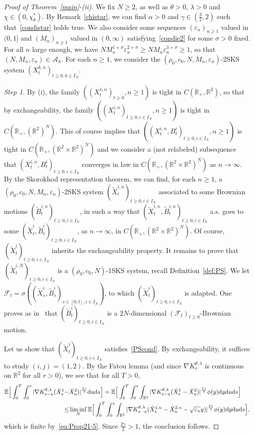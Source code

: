 \documentclass[11pt]{article}
\newcommand{\E}{\mathbb{E}}
\newcommand{\R}{\mathbb{R}}
\newcommand{\1}{\mathbbm{1}}
\newcommand{\tX}{\tilde X}
\newcommand{\tB}{\tilde B}
\newcommand{\dd}{{\rm d}}
\newcommand{\Aa}{\mathcal A}
\newcommand{\Ff}{\mathcal F}
\newcommand{\e}{\varepsilon}
\newcommand{\vip}{\vskip5pt}
\begin{document}
\begin{proof}[Proof of Theorem~\ref{main}-(ii)]
We fix $N\geq 2$, as well as $\theta>0$, $\lambda>0$ and $\chi \in (0,\chi^*_\theta)$. 
By Remark~\ref{chistar}, we can find $\alpha>0$ and $\gamma\in (\frac32,2)$ such that~\eqref{condistar} 
holds true. We also consider some sequences $(\e_n)_{n\geq 1}$ valued in $(0,1]$ and
$(M_n)_{n\geq 1}$ valued in $(0,\infty)$ satisfying~\eqref{condie2}
for some $\sigma>0$ fixed.
For all $n$ large enough, we have $N M_n^{1+\sigma}\e_n^{2+\sigma}\geq N M_n\e_n^{3+\sigma}\geq 1$,
so that $(N,M_n,\e_n)\in \Aa_\sigma$. For each $n\geq 1$, we consider 
the $(\rho_0,c_0,N,M_n,\e_n)$-2SKS system $(X^{k,n}_t)_{t\geq 0, k\in I_N}$.

\vip

{\it Step 1.} By (i), the family
$((X^{1,n}_t)_{t\geq 0}, n \geq 1)$ is tight in $C(\R_+,\R^2)$, so that by exchangeability, the family
$((X^{i,n}_t)_{t\geq 0, i\in I_N}, n \geq 1)$ is tight in $C(\R_+,(\R^2)^N)$. This of course implies that
$((X^{i,n}_t,B^i_t)_{t\geq 0, i\in I_N}, n \geq 1)$ is tight in $C(\R_+,(\R^2\times \R^2)^N)$ and we consider
a (not relabeled) subsequence that $(X^{i,n}_t,B^i_t)_{t\geq 0, i\in I_N}$ converges in law
in $C(\R_+,(\R^2\times \R^2)^N)$ as $n\to \infty$.
\vip
By the Skorokhod representation theorem, we can find, for each $n\geq 1$, 
a $(\rho_0,c_0,N,M_n,\e_n)$-2SKS system $(\tX^{i,n}_t)_{t\geq 0, i \in I_N}$ associated to some Brownian
motions $(\tB^{i,n}_t)_{t\geq 0, i \in I_N}$, in such a way that 
$(\tX^{i,n}_t,\tB^{i,n}_t)_{t\geq 0, i\in I_N}$ a.s. goes to some
$(\tX^{i}_t,\tB^{i}_t)_ {t\geq 0,i\in I_N}$, as $n\to \infty$, in $C(\R_+,(\R^2\times\R^2)^{N})$.
Of course, $(\tX^{i}_t)_{t\geq 0,i \in I_N}$ inherits the exchangeability property.
It remains to prove that  $(\tX^{i,N}_t)_{t\geq 0,i\in I_N}$ is a $(\rho_0,c_0,N)$-1SKS system,
recall Definition~\ref{def:PS}.
\vip
We let $\Ff_t=\sigma((\tX_s^{i},\tB^{i}_s)_{s\in [0,t], i\in I_N})$, to which $(\tX^{i}_t)_{t\geq 0, i \in I_N}$ 
is adapted. One proves as in~\cite[Theorem~5]{fournier-jourdain} that
$(\tB^{i}_t)_{t\geq 0, i\in I_N}$ is a $2N$-dimensional $(\Ff_t)_{t\geq 0}$-Brownian motion.

\vip

Let us show that $(\tX^{i}_t)_{t\geq 0, i \in I_N}$ satisfies~\eqref{PScond}. 
By exchangeability, it suffices to study $(i,j)=(1,2)$. 
By the Fatou lemma (and since $\nabla K^{\theta,\lambda}_r$ is continuous on $\R^2$ for all $r>0$), we see that for all $T>0$,
\begin{align*}
\E\Big[\int_0^T \int_0^s |\nabla K^{\theta,\lambda}_{s-u} (\tX^{1}_s-&\tX^{2}_u)|^{\frac{2\gamma}3}  \dd u \dd s\Big]
=\E\Big[\int_0^T \int_0^s \int_{\R^2}|\nabla K^{\theta,\lambda}_{s-u} (\tX^{1}_s-\tX^{2}_u)|^{\frac{2\gamma}3} \phi(y)\dd y \dd u \dd s\Big]\\
\leq & \liminf_N \E\Big[\int_0^T \int_0^s \int_{\R^2}|\nabla K^{\theta,\lambda}_{s-u} 
(\tX^{1,n}_s-\tX^{2,n}_u-\sqrt{\e_n} y)|^{\frac{2\gamma}3} \phi(y)\dd y \dd u \dd s\Big],
\end{align*}
which is finite by~\eqref{eq:Prop21-5}.
Since $\frac{2\gamma}3>1$, the conclusion follows.


\end{proof}
\end{document}
